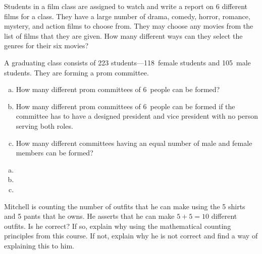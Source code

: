 \documentclass[11pt,letterpaper]{article}
\begin{document}
\newpage



 Students in a film class are assigned to watch and write a report on 6 different films for a class. They have a large number of drama, comedy, horror, romance, mystery, and action films to choose from. They may choose any movies from the list of films that they are given. How many different ways can they select the genres for their six movies? \pspace

\sol 



\newpage



 A graduating class consists of 223 students---118~female students and 105~male students. They are forming a prom committee. 
	\begin{enumerate}[(a)]
	\item How many different prom committees of 6~people can be formed?
	\item How many different prom committees of 6~people can be formed if the committee has to have a designed president and vice president with no person serving both roles. 
	\item How many different committees having an equal number of male and female members can be formed?
	\end{enumerate} \pspace

\sol 
\begin{enumerate}[(a)]
\item 
\item 
\item 
\end{enumerate}



\newpage



 Mitchell is counting the number of outfits that he can make using the 5 shirts and 5 pants that he owns. He asserts that he can make $5 + 5= 10$ different outfits. Is he correct? If so, explain why using the mathematical counting principles from this course. If not, explain why he is not correct and find a way of explaining this to him. \pspace

\sol 
\end{document}
